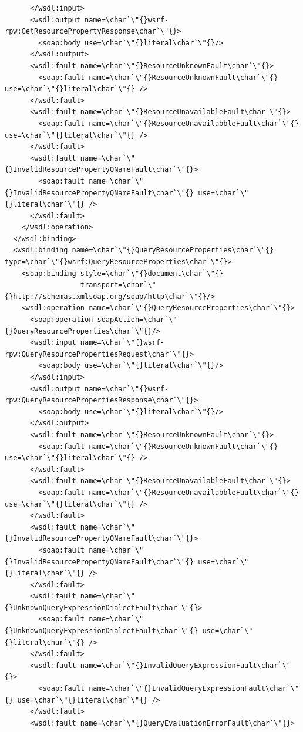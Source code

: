 \documentclass{article}                            %
\begin{document}
\begin{footnotesize}
\begin{verbatim}
      </wsdl:input>
      <wsdl:output name=\char`\"{}wsrf-rpw:GetResourcePropertyResponse\char`\"{}>
        <soap:body use=\char`\"{}literal\char`\"{}/>
      </wsdl:output>
      <wsdl:fault name=\char`\"{}ResourceUnknownFault\char`\"{}>
        <soap:fault name=\char`\"{}ResourceUnknownFault\char`\"{} use=\char`\"{}literal\char`\"{} />
      </wsdl:fault>
      <wsdl:fault name=\char`\"{}ResourceUnavailableFault\char`\"{}>
        <soap:fault name=\char`\"{}ResourceUnavailabbleFault\char`\"{} use=\char`\"{}literal\char`\"{} />
      </wsdl:fault>
      <wsdl:fault name=\char`\"{}InvalidResourcePropertyQNameFault\char`\"{}>
        <soap:fault name=\char`\"{}InvalidResourcePropertyQNameFault\char`\"{} use=\char`\"{}literal\char`\"{} />
      </wsdl:fault>
    </wsdl:operation>
  </wsdl:binding>
  <wsdl:binding name=\char`\"{}QueryResourceProperties\char`\"{} type=\char`\"{}wsrf:QueryResourceProperties\char`\"{}>
    <soap:binding style=\char`\"{}document\char`\"{}
                  transport=\char`\"{}http://schemas.xmlsoap.org/soap/http\char`\"{}/>
    <wsdl:operation name=\char`\"{}QueryResourceProperties\char`\"{}>
      <soap:operation soapAction=\char`\"{}QueryResourceProperties\char`\"{}/>
      <wsdl:input name=\char`\"{}wsrf-rpw:QueryResourcePropertiesRequest\char`\"{}>
        <soap:body use=\char`\"{}literal\char`\"{}/>
      </wsdl:input>
      <wsdl:output name=\char`\"{}wsrf-rpw:QueryResourcePropertiesResponse\char`\"{}>
        <soap:body use=\char`\"{}literal\char`\"{}/>
      </wsdl:output>
      <wsdl:fault name=\char`\"{}ResourceUnknownFault\char`\"{}>
        <soap:fault name=\char`\"{}ResourceUnknownFault\char`\"{} use=\char`\"{}literal\char`\"{} />
      </wsdl:fault>
      <wsdl:fault name=\char`\"{}ResourceUnavailableFault\char`\"{}>
        <soap:fault name=\char`\"{}ResourceUnavailabbleFault\char`\"{} use=\char`\"{}literal\char`\"{} />
      </wsdl:fault>
      <wsdl:fault name=\char`\"{}InvalidResourcePropertyQNameFault\char`\"{}>
        <soap:fault name=\char`\"{}InvalidResourcePropertyQNameFault\char`\"{} use=\char`\"{}literal\char`\"{} />
      </wsdl:fault>
      <wsdl:fault name=\char`\"{}UnknownQueryExpressionDialectFault\char`\"{}>
        <soap:fault name=\char`\"{}UnknownQueryExpressionDialectFault\char`\"{} use=\char`\"{}literal\char`\"{} />
      </wsdl:fault>
      <wsdl:fault name=\char`\"{}InvalidQueryExpressionFault\char`\"{}>
        <soap:fault name=\char`\"{}InvalidQueryExpressionFault\char`\"{} use=\char`\"{}literal\char`\"{} />
      </wsdl:fault>
      <wsdl:fault name=\char`\"{}QueryEvaluationErrorFault\char`\"{}>

\end{verbatim}
\end{footnotesize}
\end{document}
